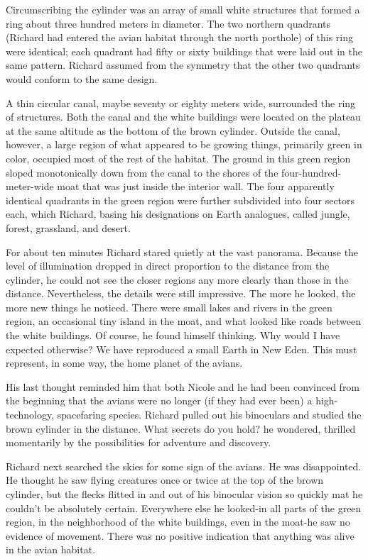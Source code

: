 \documentclass[]{article}
\begin{document}
{Circumscribing the cylinder was an array of small white structures that formed a ring about three hundred meters in diameter. The two northern quadrants (Richard had entered the avian habitat through the north porthole) of this ring were identical; each quadrant had fifty or sixty buildings that were laid out in the same pattern. Richard assumed from the symmetry that the other two quadrants would conform to the same design.

A thin circular canal, maybe seventy or eighty meters wide, surrounded the ring of structures. Both the canal and the white buildings were located on the plateau at the same altitude as the bottom of the brown cylinder. Outside the canal, however, a large region of what appeared to be growing things, primarily green in color, occupied most of the rest of the habitat. The ground in this green region sloped monotonically down from the canal to the shores of the four-hundred-meter-wide moat that was just inside the interior wall. The four apparently identical quadrants in the green region were further subdivided into four sectors each, which Richard, basing his designations on Earth analogues, called jungle, forest, grassland, and desert.

For about ten minutes Richard stared quietly at the vast panorama. Because the level of illumination dropped in direct proportion to the distance from the cylinder, he could not see the closer regions any more clearly than those in the distance. Nevertheless, the details were still impressive. The more he looked, the more new things he noticed. There were small lakes and rivers in the green region, an occasional tiny island in the moat, and what looked like roads between the white buildings. Of course, he found himself thinking. Why would I have expected otherwise? We have reproduced a small Earth in New Eden. This must represent, in some way, the home planet of the avians.

His last thought reminded him that both Nicole and he had been convinced from the beginning that the avians were no longer (if they had ever been) a high-technology, spacefaring species. Richard pulled out his binoculars and studied the brown cylinder in the distance. What secrets do you hold? he wondered, thrilled momentarily by the possibilities for adventure and discovery.

Richard next searched the skies for some sign of the avians. He was disappointed. He thought he saw flying creatures once or twice at the top of the brown cylinder, but the flecks flitted in and out of his binocular vision so quickly mat he couldn’t be absolutely certain. Everywhere else he looked-in all parts of the green region, in the neighborhood of the white buildings, even in the moat-he saw no evidence of movement. There was no positive indication that anything was alive in the avian habitat.

}
\end{document}
